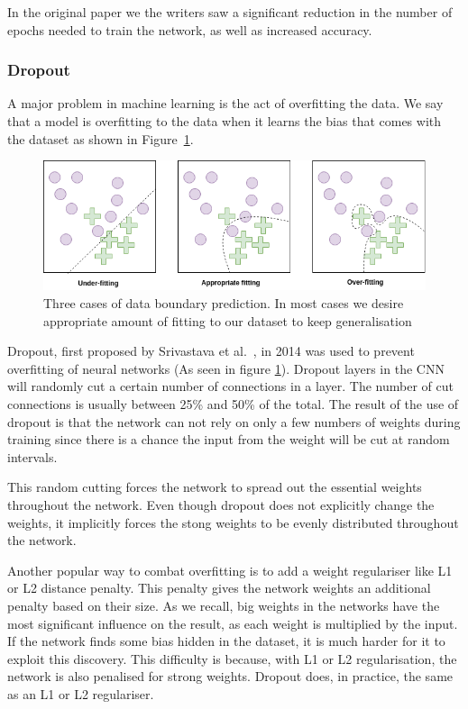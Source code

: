 In the original paper we the writers saw a significant reduction in the number of epochs needed to train the network, as well as increased accuracy.


\subsubsection{Dropout}
A major problem in machine learning is the act of overfitting the data. We say that a model is overfitting to the data when it learns the bias that comes with the dataset as shown in Figure~\ref{fig:dropout}. 
 
\begin{figure}[h]
        \centering
        \includegraphics[scale=0.6]{background/figures/Under_vs_overfitting.png}
        \caption{Three cases of data boundary prediction. In most cases we desire appropriate amount of fitting to our dataset to keep generalisation}
        \label{fig:dropout}
\end{figure}


Dropout, first proposed by Srivastava et al.~\cite{JMLR:v15:srivastava14a}, in 2014 was used to prevent overfitting of neural networks (As seen in figure \ref{fig:dropout}).
Dropout layers in the CNN will randomly cut a certain number of connections in a layer. The number of cut connections is usually between 25\% and 50\% of the total. The result of the use of dropout is that the network can not rely on only a few numbers of weights during training since there is a chance the input from the weight will be cut at random intervals. 

This random cutting forces the network to spread out the essential weights throughout the network. 
Even though dropout does not explicitly change the weights, it implicitly forces the stong weights to be evenly distributed throughout the network. 

Another popular way to combat overfitting is to add a weight regulariser like L1 or L2 distance penalty. This penalty gives the network weights an additional penalty based on their size.
As we recall, big weights in the networks have the most significant influence on the result, as each weight is multiplied by the input. If the network finds some bias hidden in the dataset, it is much harder for it to exploit this discovery.
This difficulty is because, with L1 or L2 regularisation, the network is also penalised for strong weights.
Dropout does, in practice, the same as an L1 or L2 regulariser. 



